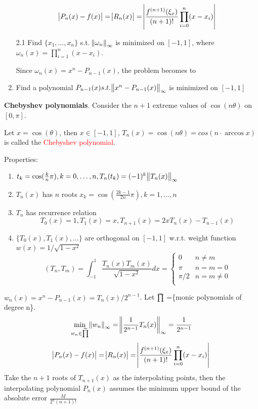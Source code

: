 \documentclass[11pt]{article}
\begin{document}
\begin{enumerate}
\begin{equation*}
\abs{P_n(x)-f(x)}=
\abs{R_n(x)}=\abs{\frac{f^{(n+1)}(\xi_x)}{(n+1)!}\displaystyle\prod_{i=0}^n(x-x_i)}
\end{equation*}

2.1 Find \(\{x_1,\dots,x_n\}\) s.t. \(\norm{\omega_n}_\infty\) is minimized on
\([-1,1]\), where \(\omega_n(x)=\displaystyle\prod_{i=1}^n(x-x_i)\).

Since \(\omega_n(x)=x^n-P_{n-1}(x)\), the problem becomes to
\item Find a polynomial \(P_{n-1}(x) s.t. \norm{x^n-P_{n-1}(x)}_\infty\) is
minimized on \([-1,1]\)
\end{enumerate}


\textbf{Chebyshev polynomials}. Consider the \(n+1\) extreme values of \(\cos(n\theta)\)
on \([0,\pi]\).

Let \(x=\cos(\theta)\), then \(x\in[-1,1]\), \(T_n(x)=\cos(n\theta)=
   cos(n\cdot \arccos x)\) is called the \textcolor{red}{Chebyshev polynomial}.

Properties:
\begin{enumerate}
\item \(t_k=\cos(\frac{k}{n}\pi), k=0,\dots,n,
      T_n(t_k)=(-1)^k\norm{T_n(x)}_\infty\)
\item \(T_n(x)\) has \(n\) roots \(x_k=\cos(\frac{2k-1}{2n}\pi), k=1,\dots,n\)
\item \(T_n\) has recurrence relation
\begin{equation*}
T_0(x)=1,T_1(x)=x,T_{n+1}(x)=2xT_n(x)-T_{n-1}(x)
\end{equation*}
\item \(\{T_0(x),T_1(x),\dots\}\) are orthogonal on \([-1,1]\) w.r.t. weight
function \(w(x)=1/\sqrt{1-x^2}\)
\begin{equation*}
(T_n,T_m)=\int_{-1}^1\frac{T_n(x)T_m(x)}{\sqrt{1-x^2}}dx=
\begin{cases}
0 & n\neq m\\
\pi & n=m=0\\
\pi/2&n=m\neq 0\\
\end{cases}
\end{equation*}
\end{enumerate}


\(w_n(x)=x^n-P_{n-1}(x)=T_n(x)/2^{n-1}\). Let \(\Wt{\prod}\) =\{monic polynomials
of degree n\}. 
\begin{equation*}
\min_{w_n\in\widetilde{\prod}}\norm{w_n}_\infty=\norm{\frac{1}
{2^{n-1}}T_n(x)}_\infty=\frac{1}{2^{n-1}}
\end{equation*}
\begin{equation*}
\abs{P_n(x)-f(x)}=
\abs{R_n(x)}=\abs{\frac{f^{(n+1)}(\xi_x)}{(n+1)!}\displaystyle\prod_{i=0}^n(x-x_i)}
\end{equation*}
Take the \(n+1\) roots of \(T_{n+1}(x)\) as the interpolating points, then the
interpolating polynomial \(P_n(x)\) assumes the minimum upper bound of the
absolute error \(\frac{M}{2^n(n+1)!}\)
\end{document}
